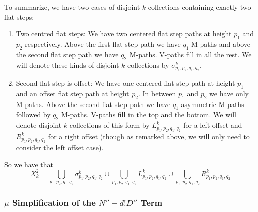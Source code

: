 \documentclass[11pt]{article}
\theoremstyle{definition}
\theoremstyle{definition}
\theoremstyle{plain}
\theoremstyle{plain}
\theoremstyle{plain}
\theoremstyle{definition}
\begin{document}
To summarize, we have two cases of disjoint $k$-collections containing exactly two flat steps:
\begin{enumerate}[label=(\alph*)]
\item Two centred flat steps: We have two centered flat step paths at height $p_1$ and $p_2$ respectively. Above the first flat step path we have $q_1$ M-paths and above the second flat step path we have $q_2$ M-paths. V-paths fill in all the rest. We will denote these kinds of disjoint $k$-collections by $\sigma_{p_1,p_2,q_1,q_2}^k$.
\item Second flat step is offset: We have one centered flat step path at height $p_1$ and an offset flat step path at height $p_2$. In between $p_1$ and $p_2$ we have only M-paths. Above the second flat step path we have $q_1$ asymmetric M-paths followed by $q_2$ M-paths. V-paths fill in the top and the bottom. We will denote disjoint $k$-collections of this form by $L_{p_1,p_2,q_1,q_2}^k$ for a left offset and $R_{p_1,p_2,q_1,q_2}^k$ for a right offset (though as remarked above, we will only need to consider the left offset case).
\end{enumerate}

So we have that
\begin{equation*}
X_{k}^2 = \bigcup\limits_{p_1,p_2,q_1,q_2}\sigma_{p_1,p_2,q_1,q_2}^k \cup \bigcup\limits_{p_1,p_2,q_1,q_2}L_{p_1,p_2,q_1,q_2}^k \cup \bigcup\limits_{p_1,p_2,q_1,q_2}R_{p_1,p_2,q_1,q_2}^k
\end{equation*}

\subsubsection*{$\mu$ Simplification of the $N''-d!D''$ Term}
\end{document}
